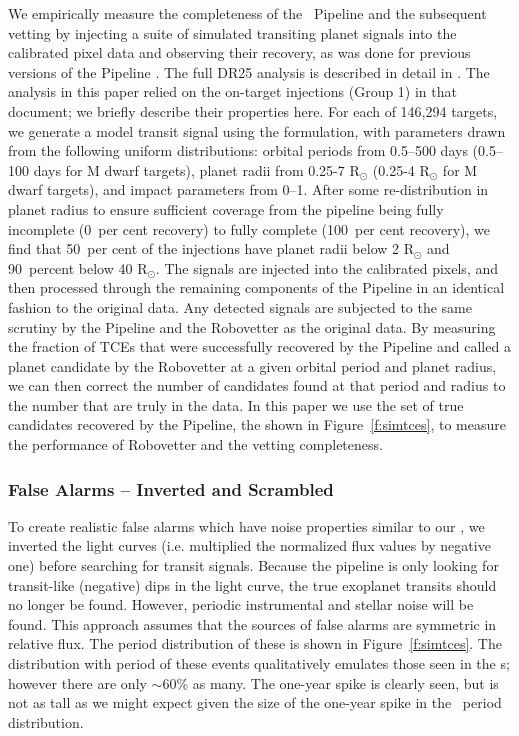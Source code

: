 We empirically measure the completeness of the \Kepler\ Pipeline and the subsequent vetting by injecting a suite of simulated transiting planet signals into the calibrated pixel data and observing their recovery, as was done for previous versions of the \Kepler{} Pipeline \citep{Christiansen2013a,Christiansen2015,Christiansen2016}. The full DR25 analysis is described in detail in \citet{Christiansen2017}. The analysis in this paper relied on the on-target injections (Group 1) in that document; we briefly describe their properties here. For each of 146,294 targets, we generate a model transit signal using the \citet{Mandel2002} formulation, with parameters drawn from the following uniform distributions: orbital periods from 0.5--500 days (0.5--100 days for M dwarf targets), planet radii from 0.25-7 R$_{\odot}$ (0.25-4 R$_{\odot}$ for M dwarf targets), and impact parameters from 0--1. After some re-distribution in planet radius to ensure sufficient coverage from the pipeline being fully incomplete (0~per cent recovery) to fully complete (100~per cent recovery), we find that 50~per cent of the injections have planet radii below 2 R$_{\odot}$ and 90~percent below 40 R$_{\odot}$. The signals are injected into the calibrated pixels, and then processed through the remaining components of the \Kepler{} Pipeline in an identical fashion to the original data. Any detected signals are subjected to the same scrutiny by the Pipeline and the Robovetter as the original data. By measuring the fraction of TCEs that were successfully recovered by the Pipeline and called a planet candidate by the Robovetter at a given orbital period and planet radius, we can then correct the number of candidates found at that period and radius to the number that are truly in the data. In this paper we use the set of true candidates recovered by the Pipeline, the  shown in Figure~\ref{f:simtces}, to measure the performance of Robovetter and the vetting completeness.


\subsubsection{False Alarms -- Inverted and Scrambled} 

To create realistic false alarms which have noise properties similar to our , we inverted the light curves (i.e. multiplied the normalized flux values by negative one) before searching for transit signals. Because the pipeline is only looking for transit-like (negative) dips in the light curve, the true exoplanet transits should no longer be found. However, periodic instrumental and stellar noise will be found. This approach assumes that the sources of false alarms are symmetric in relative flux. The period distribution of these  is shown in Figure~\ref{f:simtces}. The distribution with period of these events qualitatively emulates those seen in the \opstce s; however there are only $\sim$60\% as many. The one-year spike is clearly seen, but is not as tall as we might expect given the size of the one-year spike in the \opstce\ period distribution. 

